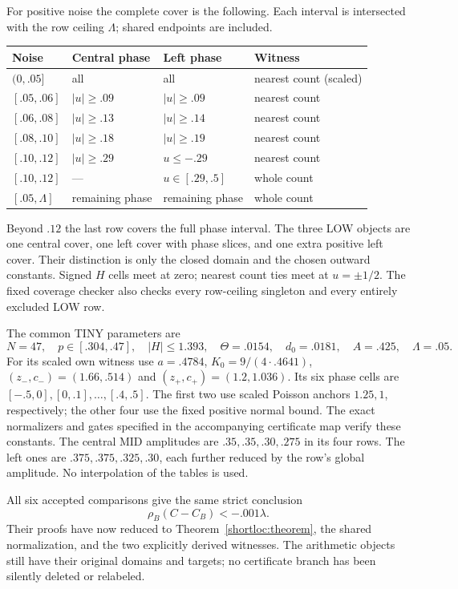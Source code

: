 For positive noise the complete cover is the following. Each interval is
intersected with the row ceiling $\Lambda$; shared endpoints are included.
\begin{center}\small
\begin{tabular}{@{}llll@{}}\toprule
Noise & Central phase & Left phase & Witness\\\midrule
$(0,.05]$ & all & all & nearest count (scaled)\\
$[.05,.06]$ & $|u|\ge.09$ & $|u|\ge.09$ & nearest count\\
$[.06,.08]$ & $|u|\ge.13$ & $|u|\ge.14$ & nearest count\\
$[.08,.10]$ & $|u|\ge.18$ & $|u|\ge.19$ & nearest count\\
$[.10,.12]$ & $|u|\ge.29$ & $u\le-.29$ & nearest count\\
$[.10,.12]$ & --- & $u\in[.29,.5]$ & whole count\\
$[.05,\Lambda]$ & remaining phase & remaining phase & whole count\\\bottomrule
\end{tabular}
\end{center}
Beyond $.12$ the last row covers the full phase interval. The three LOW
objects are one central cover, one left cover with phase slices, and one
extra positive left cover. Their distinction is only the closed domain
and the chosen outward constants. Signed $H$ cells meet at zero; nearest
count ties meet at $u=\pm1/2$. The fixed coverage checker also checks every
row-ceiling singleton and every entirely excluded LOW row.

The common TINY parameters are
\[
 N=47,\quad p\in[.304,.47],\quad |H|\le1.393,\quad
 \Theta=.0154,\quad d_0=.0181,\quad A=.425,\quad\Lambda=.05.
\]
For its scaled own witness use $a=.4784$, $K_0=9/(4\cdot.4641)$,
$(z_-,c_-)=(1.66,.514)$ and $(z_+,c_+)=(1.2,1.036)$.
Its six phase cells are $[-.5,0],[0,.1],\ldots,[.4,.5]$.
The first two use scaled Poisson anchors $1.25,1$, respectively; the other
four use the fixed positive normal bound. The exact normalizers and gates
specified in the accompanying certificate map verify these constants.
The central MID amplitudes are $.35,.35,.30,.275$ in its four rows.
The left ones are $.375,.375,.325,.30$, each further reduced by the row's
global amplitude. No interpolation of the tables is used.

All six accepted comparisons give the same strict conclusion
\[
                        \rho_B(C-C_B)<-.001\lambda.
\]
Their proofs have now reduced to Theorem~\ref{shortloc:theorem}, the shared
normalization, and the two explicitly derived witnesses. The arithmetic
objects still have their original domains and targets; no certificate
branch has been silently deleted or relabeled.

